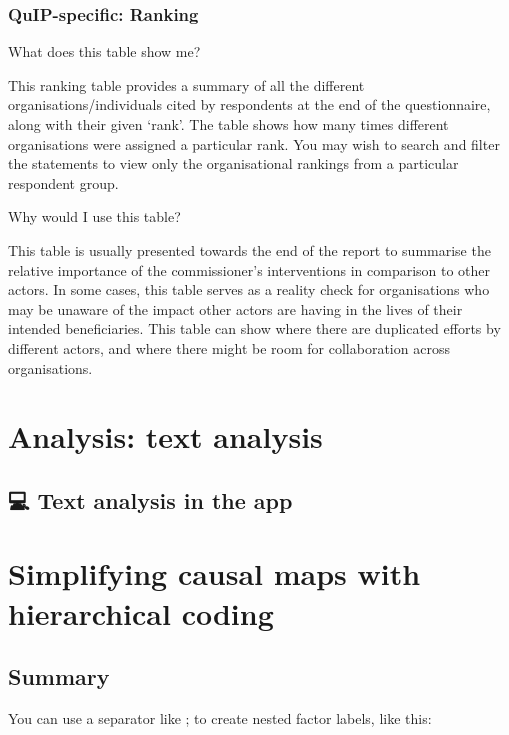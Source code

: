 \documentclass[
]{book}
\begin{document}
\hypertarget{quip-specific-ranking}{%
\subsection{QuIP-specific: Ranking}\label{quip-specific-ranking}}

What does this table show me?

This ranking table provides a summary of all the different organisations/individuals cited by respondents at the end of the questionnaire, along with their given `rank'. The table shows how many times different organisations were assigned a particular rank. You may wish to search and filter the statements to view only the organisational rankings from a particular respondent group.

Why would I use this table?

This table is usually presented towards the end of the report to summarise the relative importance of the commissioner's interventions in comparison to other actors. In some cases, this table serves as a reality check for organisations who may be unaware of the impact other actors are having in the lives of their intended beneficiaries. This table can show where there are duplicated efforts by different actors, and where there might be room for collaboration across organisations.

\hypertarget{analysis-text-analysis}{%
\chapter{Analysis: text analysis}\label{analysis-text-analysis}}

\hypertarget{text-analysis-in-the-app}{%
\section{💻 Text analysis in the app}\label{text-analysis-in-the-app}}

\hypertarget{simplifying}{%
\chapter{Simplifying causal maps with hierarchical coding}\label{simplifying}}

\hypertarget{summary-1}{%
\section{Summary}\label{summary-1}}

You can use a separator like ; to create nested factor labels, like this:
\end{document}
